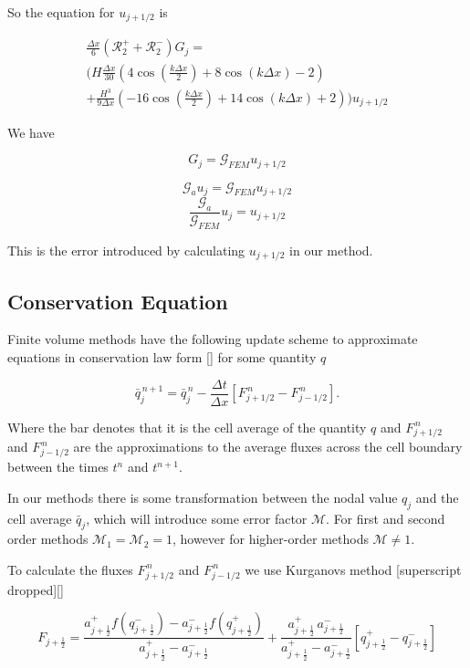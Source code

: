 \documentclass[12pt]{article}
\begin{document}

So the equation for $u_{j+1/2}$ is

\begin{multline}
\frac{\Delta x}{6}\left(\mathcal{R}^+_2 +\mathcal{R}^-_2\right)  G_j = \\ \Bigg(H\frac{\Delta x}{30} \left(4\cos\left(\frac{k\Delta x}{2}\right) + 8 \cos\left(k \Delta x\right) - 2 \right) \\+ \frac{H^3 }{9\Delta x}\left(-16\cos\left(\frac{k\Delta x}{2}\right) + 14 \cos\left(k \Delta x\right) + 2 \right)   \Bigg)  u_{j + 1/2}
\end{multline}


We have

\[G_j = \mathcal{G}_{FEM} u_{j + 1/2}\]

\[\mathcal{G}_au_j = \mathcal{G}_{FEM} u_{j + 1/2}\]
\[\frac{\mathcal{G}_a}{\mathcal{G}_{FEM}}u_j =  u_{j + 1/2}\]

This is the error introduced by calculating $u_{j+1/2}$ in our method.


\subsection{Conservation Equation}

Finite volume methods have the following update scheme to approximate equations in conservation law form [] for some quantity $q$

\[\bar{q}^{\,n + 1}_{j} = \bar{q}^{\,n}_{j} - \frac{\Delta t}{\Delta x} \left[F^{\,n} _{j+1/2} - F^{\,n} _{j-1/2} \right].\]

Where the bar denotes that it is the cell average of the quantity $q$ and $F^{\,n} _{j+1/2}$ and $F^{\,n} _{j-1/2}$ are the approximations to the average fluxes across the cell boundary between the times $t^n$ and $t^{n+1}$. 

In our methods there is some transformation between the nodal value $q_j$ and the cell average $\bar{q}_j$, which will introduce some error factor $\mathcal{M}$. For first and second order methods $\mathcal{M}_1 = \mathcal{M}_2 = 1$, however for higher-order methods $\mathcal{M} \neq 1$.

To calculate the fluxes $F^{\,n} _{j+1/2}$ and $F^{\,n} _{j-1/2}$ we use Kurganovs method [superscript dropped][]

\begin{equation*}
F_{j+\frac{1}{2}} = \dfrac{a^+_{j+\frac{1}{2}} f\left(q^-_{j+\frac{1}{2}}\right) - a^-_{j+\frac{1}{2}} f\left(q^+_{j+\frac{1}{2}}\right)}{a^+_{j+\frac{1}{2}} - a^-_{j+\frac{1}{2}}}  + \dfrac{a^+_{j+\frac{1}{2}} \, a^-_{j+\frac{1}{2}}}{a^+_{j+\frac{1}{2}} - a^-_{j+\frac{1}{2}}} \left [ q^+_{j+\frac{1}{2}} - q^-_{j+\frac{1}{2}} \right ]
\end{equation*}
\end{document}
